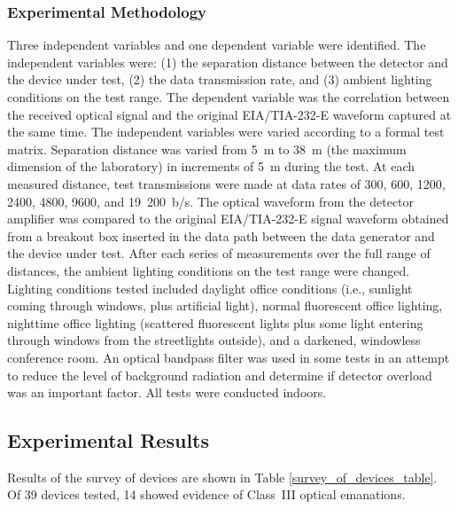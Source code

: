 \documentclass{acmtrans2e}
\begin{document}
\subsubsection{Experimental Methodology}

Three independent variables and one dependent variable were identified. 
The independent variables were: (1) the separation distance between the 
detector and the device under test, (2) the data transmission rate, and 
(3) ambient lighting conditions on the test range.  The dependent 
variable was the correlation between the received optical signal and the 
original EIA/TIA-232-E waveform captured at the same time.  The 
independent variables were varied according to a formal test matrix.  
Separation distance was varied from 5~m to 38~m (the maximum 
dimension of the laboratory) in increments of 5~m during the test.  
At each measured distance, test transmissions were made at data rates of 
300, 600, 1200, 2400, 4800, 9600, and 19~200~b/s.  The 
optical waveform from the detector amplifier was compared to the 
original EIA/TIA-232-E signal waveform obtained from a breakout box 
inserted in the data path between the data generator and the device 
under test.  After each series of measurements over the full range of 
distances, the ambient lighting conditions on the test range were 
changed.  Lighting conditions tested included daylight office conditions 
(i.e., sunlight coming through windows, plus artificial light), normal
fluorescent office lighting, nighttime office lighting (scattered 
fluorescent lights plus some light entering through windows from the 
streetlights outside), and a darkened, windowless conference room.
An optical bandpass filter was used in some tests in an attempt to 
reduce the level of background radiation and determine if detector 
overload was an important factor.  All tests were conducted indoors.

\subsection{Experimental Results}

Results of the survey of devices are shown in Table 
\ref{survey_of_devices_table}.  Of 39 devices tested, 14 showed 
evidence of Class~III optical emanations.

\def\ClassOne{& $\bullet$ & $\mbox{ }$ & $\mbox{ }$}
\def\ClassTwo{& $\mbox{ }$ & $\bullet$ & $\mbox{ }$}
\def\ClassThree{& $\mbox{ }$ & $\mbox{ }$ & $\bullet$}
\end{document}

